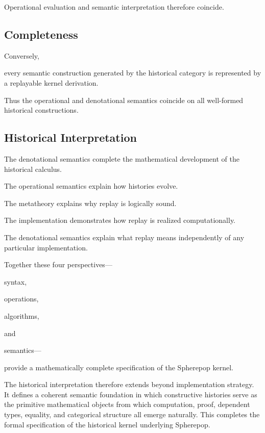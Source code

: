 \documentclass[12pt,oneside]{article}
\theoremstyle{definition}
\theoremstyle{remark}
\begin{document}
Operational evaluation and semantic interpretation therefore coincide.


\subsection{Completeness}

Conversely,

every semantic construction generated by the historical category is represented
by a replayable kernel derivation.

Thus the operational and denotational semantics coincide on all well-formed
historical constructions.


\subsection{Historical Interpretation}

The denotational semantics complete the mathematical development of the
historical calculus.

The operational semantics explain how histories evolve.

The metatheory explains why replay is logically sound.

The implementation demonstrates how replay is realized computationally.

The denotational semantics explain what replay means independently of any
particular implementation.

Together these four perspectives—

syntax,

operations,

algorithms,

and

semantics—

provide a mathematically complete specification of the Spherepop kernel.

The historical interpretation therefore extends beyond implementation strategy.
It defines a coherent semantic foundation in which constructive histories serve
as the primitive mathematical objects from which computation, proof, dependent
types, equality, and categorical structure all emerge naturally. This completes
the formal specification of the historical kernel underlying Spherepop.

\newpage
\end{document}
